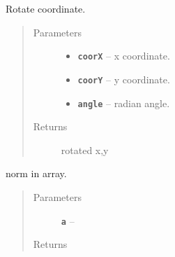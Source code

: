 \documentclass[letterpaper,10pt,english]{sphinxmanual}
\begin{document}
\begin{fulllineitems}
\label{RRtoolbox.lib.arrayops:RRtoolbox.lib.arrayops.basic.angleXY}
Rotate coordinate.
\begin{quote}\begin{description}
\item[{Parameters}] \leavevmode\begin{itemize}
\item {} 
\textbf{\texttt{coorX}} -- x coordinate.

\item {} 
\textbf{\texttt{coorY}} -- y coordinate.

\item {} 
\textbf{\texttt{angle}} -- radian angle.

\end{itemize}

\item[{Returns}] \leavevmode
rotated x,y

\end{description}\end{quote}

\end{fulllineitems}


\begin{fulllineitems}
\label{RRtoolbox.lib.arrayops:RRtoolbox.lib.arrayops.basic.anorm}
norm in array.
\begin{quote}\begin{description}
\item[{Parameters}] \leavevmode
\textbf{\texttt{a}} -- 

\item[{Returns}] \leavevmode


\end{description}\end{quote}

\end{fulllineitems}

\end{document}
